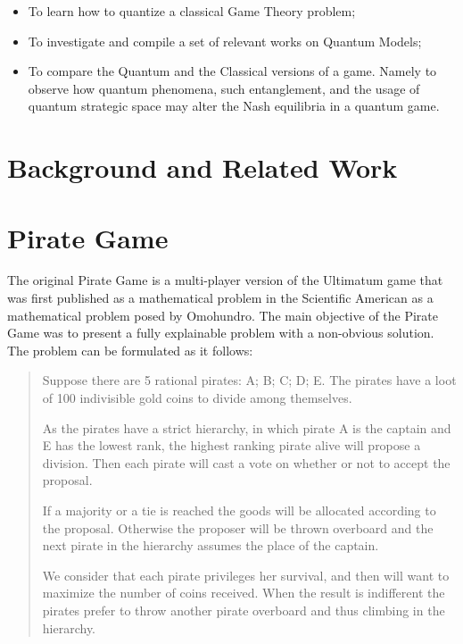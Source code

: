 \documentclass{llncs} %
\begin{document}
\begin{itemize}
\item To learn how to quantize a classical Game Theory problem;

\item To investigate and compile a set of relevant works on Quantum Models;

\item To compare the Quantum and the Classical versions of a game. Namely to observe how quantum phenomena, such entanglement, and the usage of quantum strategic space may alter the Nash equilibria in a quantum game.

\end{itemize}


\section{Background and Related Work}

\section{Pirate Game}
\label{subsec:description}

The original Pirate Game is a multi-player version of the Ultimatum game that was first published as a mathematical problem in the Scientific American as a mathematical problem posed by Omohundro\cite{Stewart1999}. The main objective of the Pirate Game was to present a fully explainable problem with a non-obvious solution. The problem can be formulated as it follows:

\begin{quotation}
Suppose there are 5 rational pirates: A; B; C; D; E. The pirates have a  loot of 100 indivisible gold coins to divide among themselves.


As the pirates have a strict hierarchy, in which pirate A is the captain and E has the lowest rank, the highest ranking pirate alive will propose a division. Then each pirate will cast a vote on whether or not to accept the proposal. 

If a majority or a tie is reached the goods will be allocated according to the proposal. Otherwise the proposer will be thrown overboard and the next pirate in the hierarchy assumes the place of the captain. 

We consider that each pirate privileges her survival, and then will want to maximize the number of coins received. When the result is indifferent the pirates prefer to throw another pirate overboard and thus climbing in the hierarchy. 
\end{quotation}
\end{document}
